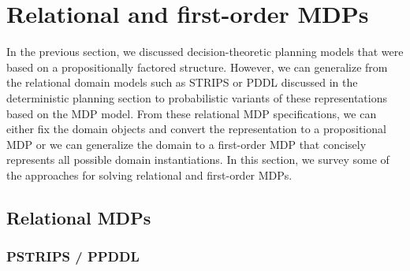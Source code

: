 


\section{Relational and first-order MDPs}

In the previous section, we discussed decision-theoretic planning
models that were based on a propositionally factored structure.
However, we can generalize from the relational domain models such as
STRIPS or PDDL discussed in the deterministic planning section to
probabilistic variants of these representations based on the MDP model.  
From these relational MDP specifications, we can either fix the domain objects and convert the
representation to a propositional MDP or we can generalize the domain to a
first-order MDP that concisely represents all possible domain
instantiations.  In this section, we survey some of the
approaches for solving relational and first-order MDPs.

\subsection{Relational MDPs}

\subsubsection{PSTRIPS / PPDDL}

